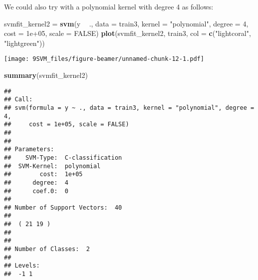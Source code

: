 \documentclass[10pt,ignorenonframetext,]{beamer}
\newenvironment{Shaded}{\begin{snugshade}}{\end{snugshade}}
\newcommand{\KeywordTok}[1]{\textcolor[rgb]{0.13,0.29,0.53}{\textbf{#1}}}
\newcommand{\DataTypeTok}[1]{\textcolor[rgb]{0.13,0.29,0.53}{#1}}
\newcommand{\DecValTok}[1]{\textcolor[rgb]{0.00,0.00,0.81}{#1}}
\newcommand{\FloatTok}[1]{\textcolor[rgb]{0.00,0.00,0.81}{#1}}
\newcommand{\StringTok}[1]{\textcolor[rgb]{0.31,0.60,0.02}{#1}}
\newcommand{\OtherTok}[1]{\textcolor[rgb]{0.56,0.35,0.01}{#1}}
\newcommand{\OperatorTok}[1]{\textcolor[rgb]{0.81,0.36,0.00}{\textbf{#1}}}
\newcommand{\NormalTok}[1]{#1}
\begin{document}
\begin{frame}[fragile]

We could also try with a polynomial kernel with degree 4 as follows:

\footnotesize

\begin{Shaded}
\begin{Highlighting}[]
\NormalTok{svmfit_kernel2 =}\StringTok{ }\KeywordTok{svm}\NormalTok{(y }\OperatorTok{~}\StringTok{ }\NormalTok{., }\DataTypeTok{data =}\NormalTok{ train3, }\DataTypeTok{kernel =} \StringTok{"polynomial"}\NormalTok{, }
    \DataTypeTok{degree =} \DecValTok{4}\NormalTok{, }\DataTypeTok{cost =} \FloatTok{1e+05}\NormalTok{, }\DataTypeTok{scale =} \OtherTok{FALSE}\NormalTok{)}
\KeywordTok{plot}\NormalTok{(svmfit_kernel2, train3, }\DataTypeTok{col =} \KeywordTok{c}\NormalTok{(}\StringTok{"lightcoral"}\NormalTok{, }\StringTok{"lightgreen"}\NormalTok{))}
\end{Highlighting}
\end{Shaded}

\texttt{[image: 9SVM\_files/figure-beamer/unnamed-chunk-12-1.pdf]}

\end{frame}

\begin{frame}[fragile]

\begin{Shaded}
\begin{Highlighting}[]
\KeywordTok{summary}\NormalTok{(svmfit_kernel2)}
\end{Highlighting}
\end{Shaded}

\begin{verbatim}
## 
## Call:
## svm(formula = y ~ ., data = train3, kernel = "polynomial", degree = 4, 
##     cost = 1e+05, scale = FALSE)
## 
## 
## Parameters:
##    SVM-Type:  C-classification 
##  SVM-Kernel:  polynomial 
##        cost:  1e+05 
##      degree:  4 
##      coef.0:  0 
## 
## Number of Support Vectors:  40
## 
##  ( 21 19 )
## 
## 
## Number of Classes:  2 
## 
## Levels: 
##  -1 1
\end{verbatim}

\normalsize

\end{frame}
\end{document}
